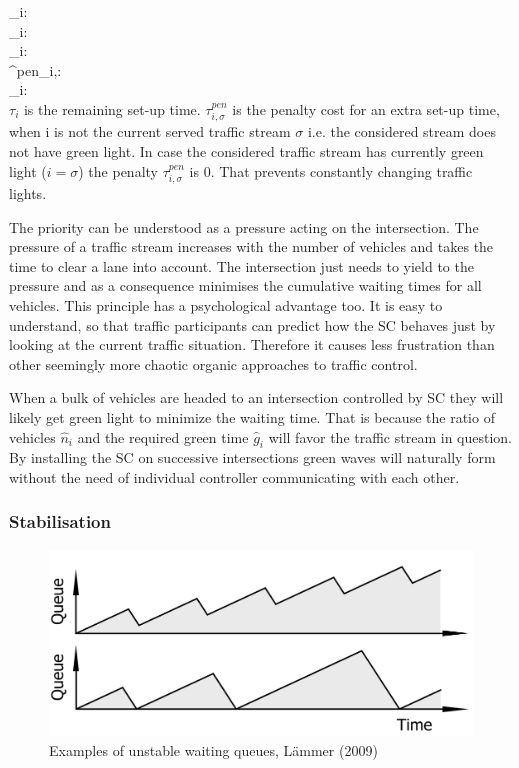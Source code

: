 \pi_{i}:   \phantom{-}    \\
_{i}:  \phantom{-}   \\
\tau_i:    \phantom{-}     \\
\tau^{pen}_{i,\sigma}:     \phantom{-}     \\
_{i}:   \phantom{-}    \\


$\tau_i$ is the remaining set-up time. $\tau^{pen}_{i,\sigma}$ is the penalty cost for an extra set-up time, when i is not the current served traffic stream $\sigma$ i.e. the considered stream does not have green light. In case the considered traffic stream has currently green light ($i=\sigma$) the penalty $\tau^{pen}_{i,\sigma}$ is 0. That prevents constantly changing traffic lights.


The priority can be understood as a pressure acting on the intersection. The pressure of a traffic stream increases with the number of vehicles and takes the time to clear a lane into account. The intersection just needs to yield to the pressure and as a consequence minimises the cumulative waiting times for all vehicles. This principle has a psychological advantage too. It is easy to understand, so that traffic participants can predict how the SC behaves just by looking at the current traffic situation. Therefore it causes less frustration than other seemingly more chaotic organic approaches to traffic control.

When a bulk of vehicles are headed to an intersection controlled by SC they will likely get green light to minimize the waiting time. That is because the ratio of vehicles $\hat{n}_{i}$ and the required green time $\hat{g}_{i}$ will favor the traffic stream in question. By installing the SC on successive intersections green waves will naturally form without the need of individual controller communicating with each other. 


\subsubsection{Stabilisation}

\begin{figure} [!htb]
	\centering
	\includegraphics[scale=0.24]{pic/unstable.png}
	\caption{Examples of unstable waiting queues, L\"ammer (2009) \cite{stabilizing}}
	\label{img20}
\end{figure}

